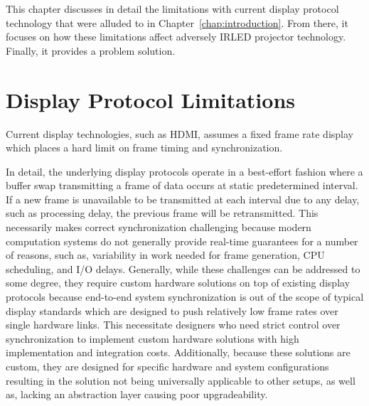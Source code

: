 \label{chap:problem_formulation}

This chapter discusses in detail the limitations with current display protocol technology that were alluded to in Chapter~\ref{chap:introduction}. From there, it focuses on how these limitations affect adversely IRLED projector technology. Finally, it provides a problem solution.

\section{Display Protocol Limitations}


    Current display technologies, such as HDMI, assumes a fixed frame rate display which places a hard limit on frame timing and synchronization.

    In detail, the underlying display protocols operate in a best-effort fashion where a buffer swap transmitting a frame of data occurs at static predetermined interval. If a new frame is unavailable to be transmitted at each interval due to any delay, such as processing delay, the previous frame will be retransmitted. This necessarily makes correct synchronization challenging because modern computation systems do not generally provide real-time guarantees for a number of reasons, such as, variability in work needed for frame generation, CPU scheduling, and I/O delays. Generally, while these challenges can be addressed to some degree, they require custom hardware solutions on top of existing display protocols because end-to-end system synchronization is out of the scope of typical display standards which are designed to push relatively low frame rates over single hardware links. This necessitate designers who need strict control over synchronization to implement custom hardware solutions with high implementation and integration costs. Additionally, because these solutions are custom, they are designed for specific hardware and system configurations resulting in the solution not being universally applicable to other setups, as well as, lacking an abstraction layer causing poor upgradeability.

